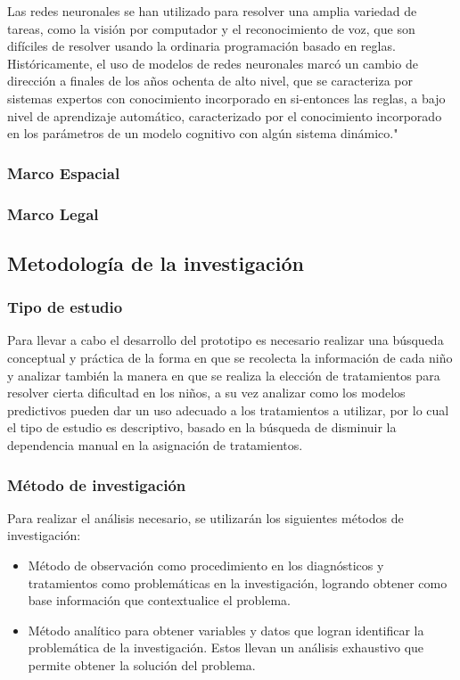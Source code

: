     Las redes neuronales se han utilizado para resolver una amplia variedad de tareas, como la visión por computador y el reconocimiento de voz, que son difíciles de resolver usando la ordinaria programación basado en reglas. Históricamente, el uso de modelos de redes neuronales marcó un cambio de dirección a finales de los años ochenta de alto nivel, que se caracteriza por sistemas expertos con conocimiento incorporado en si-entonces las reglas, a bajo nivel de aprendizaje automático, caracterizado por el conocimiento incorporado en los parámetros de un modelo cognitivo con algún sistema dinámico."
    \subsubsection{Marco Espacial}
    \subsubsection{Marco Legal}
    \subsection{Metodología de la investigación}
    \subsubsection{Tipo de estudio}
    Para llevar a cabo el desarrollo del prototipo es necesario realizar una búsqueda conceptual y práctica de la forma en que se recolecta la información de cada niño y analizar también la manera en que se realiza la elección de tratamientos para resolver cierta dificultad en los niños, a su vez analizar como los modelos predictivos pueden dar un uso adecuado a los tratamientos a utilizar, por lo cual el tipo de estudio es descriptivo, basado en la búsqueda de disminuir la dependencia manual en la asignación de tratamientos.
    \subsubsection{Método de investigación}
    Para realizar el análisis necesario, se utilizarán los siguientes métodos de investigación:
    \begin{itemize}
    \item Método de observación como procedimiento en los diagnósticos y tratamientos como problemáticas en la investigación, logrando obtener como base información que contextualice el problema.
    \item Método analítico para obtener variables y datos que logran identificar la problemática de la investigación. Estos llevan un análisis exhaustivo que permite obtener la solución del problema.
    \end{itemize}
